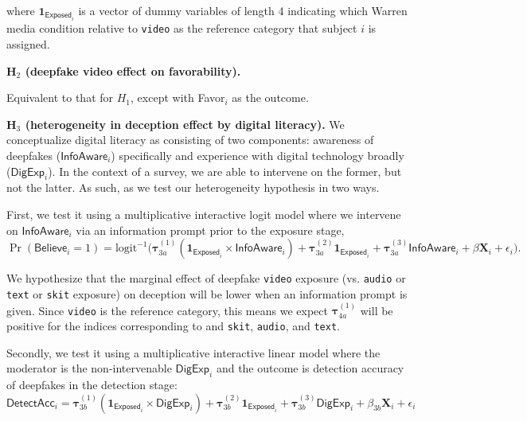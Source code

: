 \documentclass[12pt,letterpaper]{article}
\begin{document}
\noindent where $\mathbf{1}_{\textsf{Exposed}_i}$ is a vector of dummy variables of length 4 indicating which Warren media condition relative to \texttt{video} as the reference category that subject $i$ is assigned. %

\noindent \textbf{H$_2$ (deepfake video effect on favorability).}

Equivalent to that for $H_1$, except with \textsf{Favor}$_i$ as the outcome.


\noindent \textbf{H$_3$ (heterogeneity in deception effect by digital literacy).} We conceptualize digital literacy as consisting of two components: awareness of deepfakes ($\textsf{InfoAware}_i$) specifically and experience with digital technology broadly ($\textsf{DigExp}_i$). In the context of a survey, we are able to intervene on the former, but not the latter. As such, as we test our heterogeneity hypothesis in two ways.

First, we test it using a multiplicative interactive logit model where we intervene on $\textsf{InfoAware}_i$ via an information prompt prior to the exposure stage,
\begin{equation}
    \Pr(\textsf{Believe}_i=1) = \text{logit}^{-1}\Big(\bm{\tau}_{3a}^{(1)} (\mathbf{1}_{\textsf{Exposed}_i} \times \textsf{InfoAware}_i)
    + \bm{\tau}_{3a}^{(2)}\mathbf{1}_{\textsf{Exposed}_i} + \bm{\tau}_{3a}^{(3)}\textsf{InfoAware}_i +  \beta \mathbf{X}_i + \epsilon_i\Big).
\end{equation}

\noindent We hypothesize that the marginal effect of deepfake \texttt{video} exposure (vs. \texttt{audio} or \texttt{text} or \texttt{skit} exposure) on deception will be lower when an information prompt is given. Since \texttt{video} is the reference category, this means we expect $\bm{\tau}_{4a}^{(1)}$ will be positive for the indices corresponding to and \texttt{skit}, \texttt{audio}, and \texttt{text}. %

Secondly, we test it using a multiplicative interactive linear model where the moderator is the non-intervenable $\textsf{DigExp}_i$ and the outcome is detection accuracy of deepfakes in the detection stage:
\begin{equation}
    \textsf{DetectAcc}_i = \bm{\tau}_{3b}^{(1)} (\mathbf{1}_{\textsf{Exposed}_i} \times \textsf{DigExp}_i)
    + \bm{\tau}_{3b}^{(2)}\mathbf{1}_{\textsf{Exposed}_i} + \bm{\tau}_{3b}^{(3)}\textsf{DigExp}_i +  \beta_{3b}\mathbf{X}_i + \epsilon_i
\end{equation}
\end{document}
